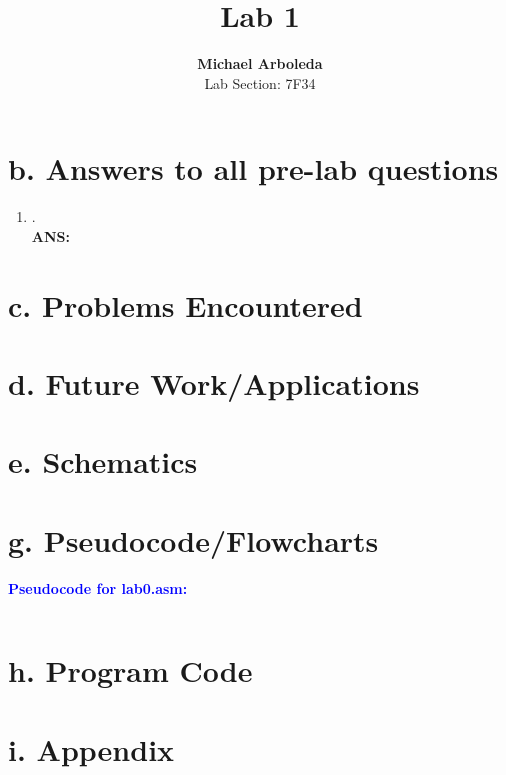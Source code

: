 \documentclass[11pt]{article}
\theoremstyle{plain}
\theoremstyle{definition}
\begin{document}
\captionsetup[figure]{labelfont=bf} 

\title{Lab 1}
\author{\textbf{Michael Arboleda}\\Lab Section: 7F34}
\maketitle
\section*{b. Answers to all pre-lab questions}
\begin{enumerate}[label={\arabic*)},font={\color{red}\bfseries}]
	\item .
	\\[0.8ex]
	\textbf{ANS:}
\end{enumerate}
\section*{c. Problems Encountered}
\section*{d. Future Work/Applications}
\section*{e. Schematics}
\section*{g. Pseudocode/Flowcharts}
\textbf{\textcolor{blue}{Pseudocode for lab0.asm:}}
\begin{tcolorbox}
\begin{verbatim}
\end{verbatim}
\end{tcolorbox}
\section*{h. Program Code}
\section*{i. Appendix}
\end{document}
